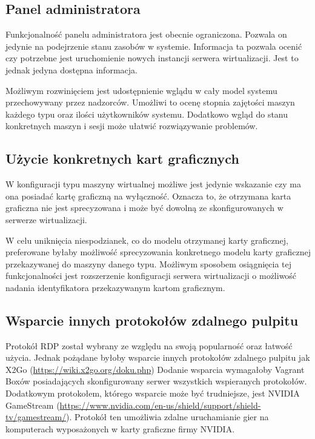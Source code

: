 \documentclass[../podsumowanie.tex]{subfiles}
\begin{document}
\label{future_directions}

\subsection{Panel administratora}

Funkcjonalność panelu administratora jest obecnie ograniczona. Pozwala on jedynie na podejrzenie stanu zasobów w systemie. Informacja ta pozwala ocenić czy potrzebne jest uruchomienie nowych instancji serwera wirtualizacji. Jest to jednak jedyna dostępna informacja.

Możliwym rozwinięciem jest udostępnienie wglądu w cały model systemu przechowywany przez nadzorców. Umożliwi to ocenę stopnia zajętości maszyn każdego typu oraz ilości użytkowników systemu. Dodatkowo wgląd do stanu konkretnych maszyn i sesji może ułatwić rozwiązywanie problemów.

\subsection{Użycie konkretnych kart graficznych}

W konfiguracji typu maszyny wirtualnej możliwe jest jedynie wskazanie czy ma ona posiadać kartę graficzną na wyłączność. Oznacza to, że otrzymana karta graficzna nie jest sprecyzowana i może być dowolną ze skonfigurowanych w serwerze wirtualizacji.

W celu uniknięcia niespodzianek, co do modelu otrzymanej karty graficznej, preferowane byłaby możliwość sprecyzowania konkretnego modelu karty graficznej przekazywanej do maszyny danego typu. Możliwym sposobem osiągnięcia tej funkcjonalności jest rozszerzenie konfiguracji serwera wirtualizacji o możliwość nadania identyfikatora przekazywanym kartom graficznym.

\subsection{Wsparcie innych protokołów zdalnego pulpitu}

Protokół RDP został wybrany ze względu na swoją popularność oraz łatwość użycia. Jednak pożądane byłoby wsparcie innych protokołów zdalnego pulpitu jak X2Go (\url{https://wiki.x2go.org/doku.php})
Dodanie wsparcia wymagałoby Vagrant Boxów posiadających skonfigurowany serwer wszystkich wspieranych protokołów. Dodatkowym protokołem, którego wsparcie może być trudniejsze, jest NVIDIA GameStream (\url{https://www.nvidia.com/en-us/shield/support/shield-tv/gamestream/}).
Protokół ten umożliwia zdalne uruchamianie gier na komputerach wyposażonych w karty graficzne firmy NVIDIA.
\end{document}
